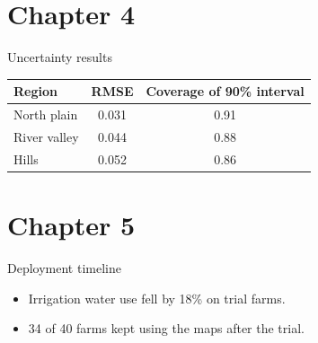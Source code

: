 \documentclass{beamer}
\begin{document}
\section{Chapter 4}
\begin{frame}{Uncertainty results}
  \centering
  \begin{tabular}{lcc}
    \toprule
    Region & RMSE & Coverage of 90\% interval \\
    \midrule
    North plain & 0.031 & 0.91 \\
    River valley & 0.044 & 0.88 \\
    Hills & 0.052 & 0.86 \\
    \bottomrule
  \end{tabular}
\end{frame}

\section{Chapter 5}
\begin{frame}{Deployment timeline}
  \centering
  \vspace{1em}
  \begin{itemize}
    \item Irrigation water use fell by 18\% on trial farms.
    \item 34 of 40 farms kept using the maps after the trial.
  \end{itemize}
\end{frame}
\end{document}

